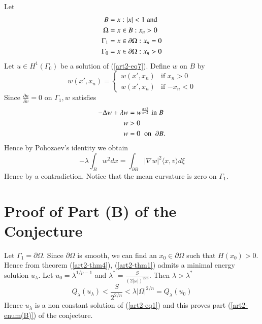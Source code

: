\begin{sketchoftheproof}
\begin{enumerate}[\rm \bf Step 1.]
\begin{example}
Let  
\begin{align*} 
B &={x : |x| < 1}\; {\rm and}\\
\Omega &= {x \in B : x_{n} > 0}\\
\Gamma_{1} &= {x\in \partial \Omega : x_{n} = 0}\\
\Gamma_{0} &= {x\in \partial \Omega : x_{n} > 0}
\end{align*}
Let $u\in H^{1}(\Gamma_{0})$ be a solution of (\ref{art2-eq7}). Define $w$ on $B$ by
\begin{equation*}
w(x', x_{n}) = 
\begin{cases}
w(x', x_{n}) & \text{if $x_{n} > 0$}\\
w(x', x_{n}) & \text{if $-x_{n}< 0$}
\end{cases}
\end{equation*}
Since $\frac{\partial u}{\partial v} = 0$  on $ \Gamma_{1}, w$ satisfies 
\begin{align*}
-\Delta w + \lambda w &= w^{\frac{n+2}{n-2}}\; {\rm in}\; B\\
w &> 0\\
w &= 0 \;\;\text{on}\;\; \partial B.
\end{align*}
Hence by Pohozaev's identity we obtain
$$
-\lambda \int_{B} w^{2} dx = \int_{\partial B} |\nabla w|^{2} \langle x, v\rangle d\xi 
$$
Hence by a contradiction. Notice that the mean curvature is zero on $\Gamma_{1}$.
\end{example}
\end{enumerate}
\end{sketchoftheproof}

\section*{Proof of Part (B) of the Conjecture}

Let $\Gamma_{1} = \partial\Omega$. Since $\partial\Omega$ is smooth, we can find an $x_{0} \in \partial\Omega$ such that $H(x_{0})> 0$. Hence from theorem (\ref{art2-thm4}), (\ref{art2-thm1}) admits a minimal energy solution $u_{\lambda}$. Let $u_{0} = \lambda^{1/p-1}$ and $\lambda^* = \frac{S}{(2|\omega|)^{2/n}}$. Then  $\lambda > \lambda^*$
$$
Q_{\lambda}(u_{\lambda}) < \dfrac{S}{2^{2/n}}< \lambda|\Omega|^{2/n} = Q_{\lambda}(u_{0})
$$
Hence $u_{\lambda}$ is a non constant solution of (\ref{art2-eq1}) and this proves part (\ref{art2-enum(B)}) of the conjecture.

